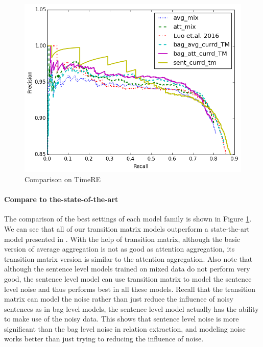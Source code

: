 \begin{figure}[htbp]
\begin{center}
\includegraphics[width=0.9\linewidth]{figures/best_cmp_exp_overall.png}
\caption{Comparison on TimeRE}
\label{fig: cmp_luo}
\end{center}
\end{figure}

\paragraph{Compare to the-state-of-the-art} 
The comparison of the best settings of each model family is shown in Figure \ref{fig: cmp_luo}. We can see that all of our transition matrix models outperform a state-the-art model presented in \cite{luo2016temporal}. With the help of transition matrix, although the basic version of average aggregation is not as good as attention aggregation, its transition matrix version is similar to the attention aggregation. Also note that although the sentence level models trained on mixed data do not perform very good, the sentence level model can use transition matrix to model the sentence level noise and thus performs best in all these models. Recall that the transition matrix can model the noise rather than just reduce the influence of noisy sentences as in bag level models, the sentence level model actually has the ability to make use of the noisy data. This shows that sentence level noise is more significant than the bag level noise in relation extraction, and modeling noise works better than just trying to reducing the influence of noise.


